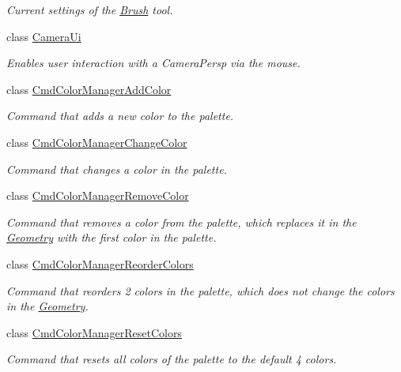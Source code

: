 \begin{DoxyCompactItemize}
\begin{DoxyCompactList}\small\item\em Current settings of the \mbox{\hyperlink{classpepr3d_1_1_brush}{Brush}} tool. \end{DoxyCompactList}\item 
class \mbox{\hyperlink{classpepr3d_1_1_camera_ui}{Camera\+Ui}}
\begin{DoxyCompactList}\small\item\em Enables user interaction with a Camera\+Persp via the mouse. \end{DoxyCompactList}\item 
class \mbox{\hyperlink{classpepr3d_1_1_cmd_color_manager_add_color}{Cmd\+Color\+Manager\+Add\+Color}}
\begin{DoxyCompactList}\small\item\em Command that adds a new color to the palette. \end{DoxyCompactList}\item 
class \mbox{\hyperlink{classpepr3d_1_1_cmd_color_manager_change_color}{Cmd\+Color\+Manager\+Change\+Color}}
\begin{DoxyCompactList}\small\item\em Command that changes a color in the palette. \end{DoxyCompactList}\item 
class \mbox{\hyperlink{classpepr3d_1_1_cmd_color_manager_remove_color}{Cmd\+Color\+Manager\+Remove\+Color}}
\begin{DoxyCompactList}\small\item\em Command that removes a color from the palette, which replaces it in the \mbox{\hyperlink{classpepr3d_1_1_geometry}{Geometry}} with the first color in the palette. \end{DoxyCompactList}\item 
class \mbox{\hyperlink{classpepr3d_1_1_cmd_color_manager_reorder_colors}{Cmd\+Color\+Manager\+Reorder\+Colors}}
\begin{DoxyCompactList}\small\item\em Command that reorders 2 colors in the palette, which does not change the colors in the \mbox{\hyperlink{classpepr3d_1_1_geometry}{Geometry}}. \end{DoxyCompactList}\item 
class \mbox{\hyperlink{classpepr3d_1_1_cmd_color_manager_reset_colors}{Cmd\+Color\+Manager\+Reset\+Colors}}
\begin{DoxyCompactList}\small\item\em Command that resets all colors of the palette to the default 4 colors. \end{DoxyCompactList}\item 

\end{DoxyCompactItemize}
